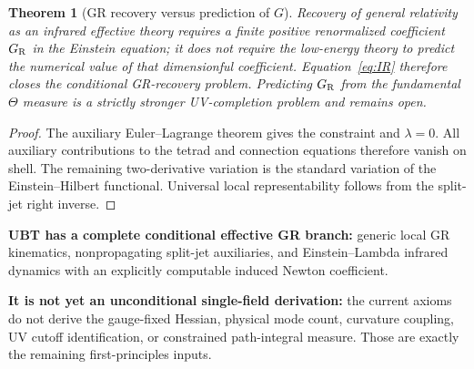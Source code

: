 \documentclass[11pt,a4paper]{article}
\newtheorem{theorem}{Theorem}
\begin{document}
\begin{theorem}[GR recovery versus prediction of $G$]
Recovery of general relativity as an infrared effective theory requires a
finite positive renormalized coefficient $G_{\rm R}$ in the Einstein equation;
it does not require the low-energy theory to predict the numerical value of
that dimensionful coefficient.  Equation~\eqref{eq:IR} therefore closes the
conditional GR-recovery problem.  Predicting $G_{\rm R}$ from the fundamental
$\Theta$ measure is a strictly stronger UV-completion problem and remains
open.
\end{theorem}

\begin{proof}
The auxiliary Euler--Lagrange theorem gives the constraint and $\lambda=0$.
All auxiliary contributions to the tetrad and connection equations therefore
vanish on shell.  The remaining two-derivative variation is the standard
variation of the Einstein--Hilbert functional.  Universal local
representability follows from the split-jet right inverse.
\end{proof}

\begin{tcolorbox}[colback=green!6!white,colframe=green!55!black,title=Strongest justified conclusion]
\textbf{UBT has a complete conditional effective GR branch:} generic local GR
kinematics, nonpropagating split-jet auxiliaries, and Einstein--Lambda infrared
dynamics with an explicitly computable induced Newton coefficient.

\medskip
\textbf{It is not yet an unconditional single-field derivation:} the current
axioms do not derive the gauge-fixed Hessian, physical mode count, curvature
coupling, UV cutoff identification, or constrained path-integral measure.
Those are exactly the remaining first-principles inputs.
\end{tcolorbox}
\end{document}
